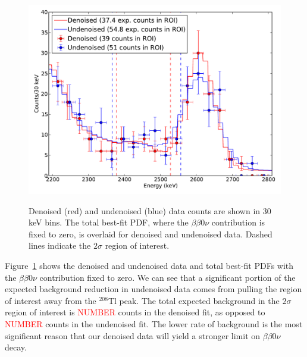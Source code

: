 \begin{figure}
\begin{center}
\includegraphics[keepaspectratio=true,width=\textwidth]{DenoisedVsUndenoised_TotalPdfsWithData.pdf}
\end{center}
\renewcommand{\baselinestretch}{1}
\small\normalsize
\begin{quote}
\caption{Denoised (red) and undenoised (blue) data counts are shown in 30 keV bins.  The total best-fit PDF, where the $\beta\beta 0\nu$ contribution is fixed to zero, is overlaid for denoised and undenoised data.  Dashed lines indicate the $2\sigma$ region of interest.}
\label{fig:DenoisedComparison_DataTotalPdf}
\end{quote}
\end{figure}
\renewcommand{\baselinestretch}{2}
\small\normalsize

Figure~\ref{fig:DenoisedComparison_DataTotalPdf} shows the denoised and undenoised data and total best-fit PDFs with the $\beta\beta 0\nu$ contribution fixed to zero.  We can see that a significant portion of the expected background reduction in undenoised data comes from pulling the region of interest away from the $^{208}$Tl peak.  The total expected background in the $2\sigma$ region of interest is \textcolor{red}{NUMBER} counts in the denoised fit, as opposed to \textcolor{red}{NUMBER} counts in the undenoised fit.  The lower rate of background is the most significant reason that our denoised data will yield a stronger limit on $\beta\beta 0\nu$ decay.

